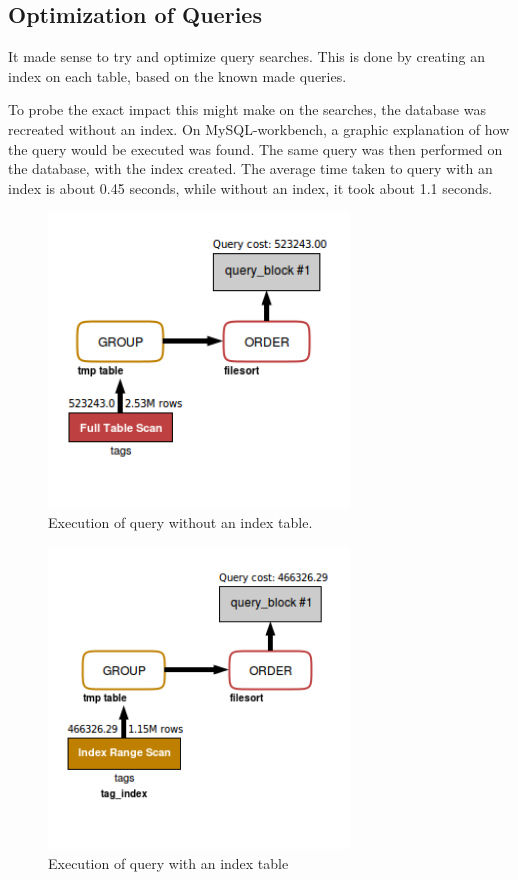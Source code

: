 \documentclass{article}
\begin{document}
\subsection{Optimization of Queries}
It made sense to try and optimize query searches.  This is done by
creating an index on each table, based on the known made queries.

To probe the exact impact this might make on the searches, the database
was recreated without an index.  On MySQL-workbench, a graphic explanation of
how the query would be executed was found. The same query was then performed
on the database, with the index created. The average time taken to query with
an index is about 0.45 seconds, while without an index, it took about 1.1
seconds.

\begin{figure}[h]
	\includegraphics[width=8cm]{Query_eco_code_no_index}
	\caption{Execution of query without an index table.}
	\label{figure:2}
\end{figure}

\begin{figure}[h]
	\includegraphics[width=8cm]{Query_eco_code_w_index}
	\caption{Execution of query with an index table}
	\label{figure:3}
\end{figure}
\end{document}
